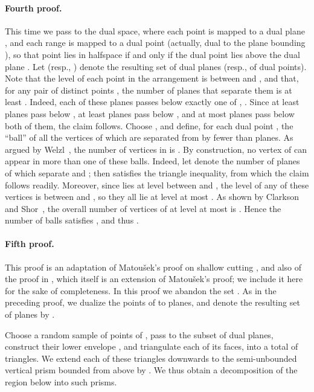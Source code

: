 \documentclass[12pt]{article}
\providecommand{\Matousek}{Matou{\v s}ek\xspace}
\begin{document}
\paragraph{Fourth proof.}
This time we pass to the dual space, where each point  is
mapped to a dual plane , and each range  is mapped to a
dual point  (actually, dual to the plane bounding ),
so that point  lies in halfspace  if and only
if the dual point  lies above the dual plane .  Let 
(resp., ) denote the resulting set of  dual planes (resp., of
 dual points).  Note that the level of each point  in
the arrangement  is between  and , and that,
for any pair of distinct points , the number of
planes that separate them is at least .  Indeed, each of
these planes passes below exactly one of , .  Since at least
 planes pass below , at least  planes pass below , and
at most  planes pass below both of them, the claim follows.
Choose , and define, for each dual point ,
the ``ball''  of all the vertices of  which are
separated from  by fewer than  planes.  As argued by
Welzl~\cite{w-stlcn-92}, the number of vertices in  is
. By construction, no vertex of  can
appear in more than one of these balls. Indeed, let 
denote the number of planes of  which separate  and ; then
 satisfies the triangle inequality, from which the claim
follows readily. Moreover, since  lies at level between  and
, the level of any of these vertices is between  and ,
so they all lie at level at most .  As shown by Clarkson and
Shor~\cite{cs-arscg-89}, the overall number of vertices of 
at level at most  is .  Hence the number  of balls
satisfies , and thus .  

\paragraph{Fifth proof.}
This proof is an adaptation of \Matousek's proof on shallow cutting
\cite[Section 5]{m-rph-92}, and also of the proof in
\cite{cv-iaags-07}, which itself is an extension of \Matousek's proof;
we include it here for the sake of completeness.  In this proof we
abandon the set .  As in the preceding proof, we dualize the
points of  to planes, and denote the resulting set of planes by
.

Choose a random sample  of  points
of , pass to the subset  of dual planes,
construct their lower envelope , and triangulate each of its
faces, into a total of  triangles. We extend each of these
triangles  downwards to the semi-unbounded vertical prism 
bounded from above by . We thus obtain a decomposition
of the region  below  into  such prisms.
\end{document}

